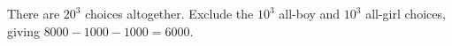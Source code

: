 There are $20^3$ choices altogether. Exclude the $10^3$ all-boy and $10^3$ all-girl choices, giving $8000-1000-1000=\boxed{6000}$.
